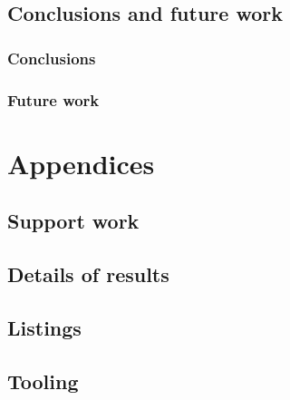 \documentclass[
  oneside,
  11pt, a4paper,
  footinclude=true,
  headinclude=true,
  cleardoublepage=empty
]{scrbook}
\begin{document}
\chapter{Conclusions and future work}
\section{Conclusions}
\section{Future work}
		
\cleardoublepage


\printindex
	
	\appendix
	\renewcommand\chaptername{Appendix}


\part{Appendices}

\chapter{Support work}

\chapter{Details of results}

\chapter{Listings}

\chapter{Tooling}

	
\begin{backcover}
\thispagestyle{empty} \pagecolor{white} \textcolor{black} {\selectfont ~\vfill
\noindent
%
\vfill ~}
\end{backcover}
\end{document}
